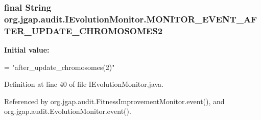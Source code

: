 \hypertarget{interfaceorg_1_1jgap_1_1audit_1_1_i_evolution_monitor_aaa3ffaf6df6b5ae5b41e8352969b503a}{
\subsubsection[{M\-O\-N\-I\-T\-O\-R\-\_\-\-E\-V\-E\-N\-T\-\_\-\-A\-F\-T\-E\-R\-\_\-\-U\-P\-D\-A\-T\-E\-\_\-\-C\-H\-R\-O\-M\-O\-S\-O\-M\-E\-S2}]{\setlength{\rightskip}{0pt plus 5cm}final String org.\-jgap.\-audit.\-I\-Evolution\-Monitor.\-M\-O\-N\-I\-T\-O\-R\-\_\-\-E\-V\-E\-N\-T\-\_\-\-A\-F\-T\-E\-R\-\_\-\-U\-P\-D\-A\-T\-E\-\_\-\-C\-H\-R\-O\-M\-O\-S\-O\-M\-E\-S2\hspace{0.3cm}{\ttfamily [static]}}}\label{interfaceorg_1_1jgap_1_1audit_1_1_i_evolution_monitor_aaa3ffaf6df6b5ae5b41e8352969b503a}
{\bfseries Initial value\-:}
\begin{DoxyCode}
=
      \textcolor{stringliteral}{"after\_update\_chromosomes(2)"}
\end{DoxyCode}


Definition at line 40 of file I\-Evolution\-Monitor.\-java.



Referenced by org.\-jgap.\-audit.\-Fitness\-Improvement\-Monitor.\-event(), and org.\-jgap.\-audit.\-Evolution\-Monitor.\-event().

